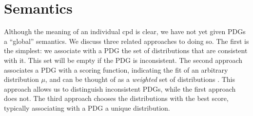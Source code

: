 \documentclass[letterpaper]{article} %
\theoremstyle{plain}
\theoremstyle{definition}
\theoremstyle{remark}
\begin{document}
\section{Semantics}\label{sec:semantics}
Although the meaning of an individual cpd is clear, we have not yet given 
PDGs a ``global'' semantics. We discuss three related approaches to
doing so. The
first 
is the 
simplest: we associate with a PDG the set of distributions that are consistent
with it. This set will be empty if the PDG is inconsistent.
%
The second approach associates a PDG with a scoring function, indicating the fit
of an arbitrary distribution $\mu$, and can be thought of as a \emph{weighted}
set of distributions \cite{HL12}. This approach allows us to distinguish
inconsistent PDGs, while the first approach does not. The third approach chooses
the distributions with the best score, typically associating with a PDG a unique
distribution.
\end{document}
